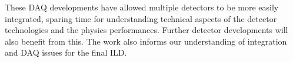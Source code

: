 These DAQ developments have allowed multiple detectors to be more easily integrated, sparing time for understanding technical aspects of the detector technologies and the physics performances.  Further detector developments will also benefit from this. The work also informs our understanding of integration and DAQ issues for the final ILD.

